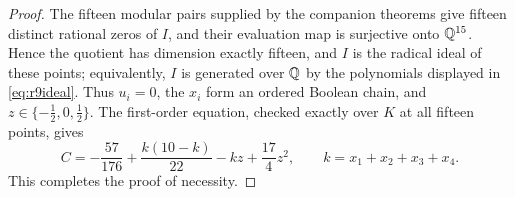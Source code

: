 \begin{proof}
The fifteen modular pairs supplied by the companion theorems give fifteen distinct rational zeros of $I$, and their evaluation map is surjective onto $\mathbb{Q}^{15}$. Hence the quotient has dimension exactly fifteen, and $I$ is the radical ideal of these points; equivalently, $I$ is generated over $\mathbb{Q}$ by the polynomials displayed in \eqref{eq:r9ideal}. Thus $u_i=0$, the $x_i$ form an ordered Boolean chain, and $z\in\{-\frac12,0,\frac12\}$. The first-order equation, checked exactly over $K$ at all fifteen points, gives
\[
C=-\frac{57}{176}+\frac{k(10-k)}{22}-kz+\frac{17}4z^2,\qquad k=x_1+x_2+x_3+x_4.
\]
This completes the proof of necessity.
\end{proof}

